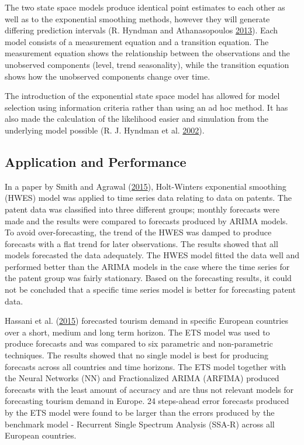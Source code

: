 \documentclass[12pt,preprint, authoryear]{elsarticle}
\numberwithin{equation}{section}
\numberwithin{figure}{section}
\numberwithin{table}{section}
\begin{document}
The two state space models produce identical point estimates to each
other as well as to the exponential smoothing methods, however they will
generate differing prediction intervals (R. Hyndman and Athanasopoulos
\protect\hyperlink{ref-hyndman2013forecasting}{2013}). Each model
consists of a measurement equation and a transition equation. The
measurement equation shows the relationship between the observations and
the unobserved components (level, trend seasonality), while the
transition equation shows how the unobserved components change over
time.

The introduction of the exponential state space model has allowed for
model selection using information criteria rather than using an ad hoc
method. It has also made the calculation of the likelihood easier and
simulation from the underlying model possible (R. J. Hyndman et al.
\protect\hyperlink{ref-hyndman2002state}{2002}).

\subsection{Application and
Performance}\label{application-and-performance}

In a paper by Smith and Agrawal
(\protect\hyperlink{ref-smith2015comparison}{2015}), Holt-Winters
exponential smoothing (HWES) model was applied to time series data
relating to data on patents. The patent data was classified into three
different groups; monthly forecasts were made and the results were
compared to forecasts produced by ARIMA models. To avoid
over-forecasting, the trend of the HWES was damped to produce forecasts
with a flat trend for later observations. The results showed that all
models forecasted the data adequately. The HWES model fitted the data
well and performed better than the ARIMA models in the case where the
time series for the patent group was fairly stationary. Based on the
forecasting results, it could not be concluded that a specific time
series model is better for forecasting patent data.

Hassani et al. (\protect\hyperlink{ref-hassani2015forecasting}{2015})
forecasted tourism demand in specific European countries over a short,
medium and long term horizon. The ETS model was used to produce
forecasts and was compared to six parametric and non-parametric
techniques. The results showed that no single model is best for
producing forecasts across all countries and time horizons. The ETS
model together with the Neural Networks (NN) and Fractionalized ARIMA
(ARFIMA) produced forecasts with the least amount of accuracy and are
thus not relevant models for forecasting tourism demand in Europe. 24
steps-ahead error forecasts produced by the ETS model were found to be
larger than the errors produced by the benchmark model - Recurrent
Single Spectrum Analysis (SSA-R) across all European countries.
\end{document}
